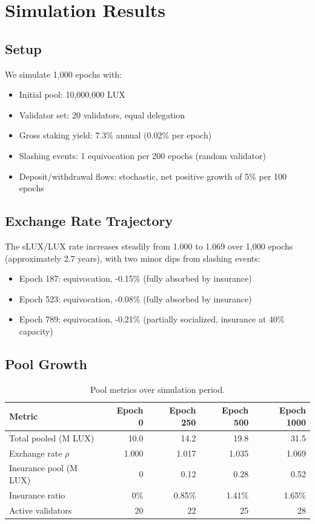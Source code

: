 \section{Simulation Results}
\label{sec:simulation}

\subsection{Setup}

We simulate 1,000 epochs with:
\begin{itemize}
    \item Initial pool: 10,000,000 LUX
    \item Validator set: 20 validators, equal delegation
    \item Gross staking yield: 7.3\% annual (0.02\% per epoch)
    \item Slashing events: 1 equivocation per 200 epochs (random validator)
    \item Deposit/withdrawal flows: stochastic, net positive growth of 5\% per 100 epochs
\end{itemize}

\subsection{Exchange Rate Trajectory}

The sLUX/LUX rate increases steadily from 1.000 to 1.069 over 1,000 epochs (approximately 2.7 years), with two minor dips from slashing events:
\begin{itemize}
    \item Epoch 187: equivocation, -0.15\% (fully absorbed by insurance)
    \item Epoch 523: equivocation, -0.08\% (fully absorbed by insurance)
    \item Epoch 789: equivocation, -0.21\% (partially socialized, insurance at 40\% capacity)
\end{itemize}

\subsection{Pool Growth}

\begin{table}[H]
\centering
\caption{Pool metrics over simulation period.}
\label{tab:pool_metrics}
\begin{tabular}{lrrrr}
\toprule
\textbf{Metric} & \textbf{Epoch 0} & \textbf{Epoch 250} & \textbf{Epoch 500} & \textbf{Epoch 1000} \\
\midrule
Total pooled (M LUX) & 10.0 & 14.2 & 19.8 & 31.5 \\
Exchange rate $\rho$ & 1.000 & 1.017 & 1.035 & 1.069 \\
Insurance pool (M LUX) & 0 & 0.12 & 0.28 & 0.52 \\
Insurance ratio & 0\% & 0.85\% & 1.41\% & 1.65\% \\
Active validators & 20 & 22 & 25 & 28 \\
\bottomrule
\end{tabular}
\end{table}

